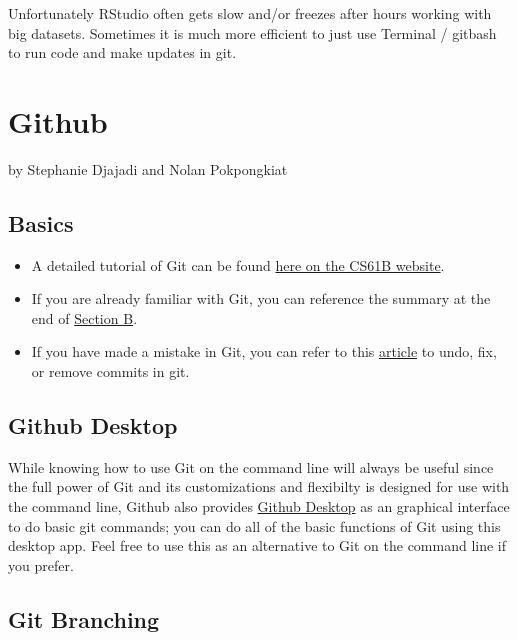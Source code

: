 \documentclass[]{book}
\providecommand{\tightlist}{%
  \setlength{\itemsep}{0pt}\setlength{\parskip}{0pt}}
\begin{document}
Unfortunately RStudio often gets slow and/or freezes after hours working
with big datasets. Sometimes it is much more efficient to just use
Terminal / gitbash to run code and make updates in git.

\chapter{Github}\label{github}

by Stephanie Djajadi and Nolan Pokpongkiat

\section{Basics}\label{basics}

\begin{itemize}
\tightlist
\item
  A detailed tutorial of Git can be found
  \href{https://sp19.datastructur.es/materials/guides/using-git\#b-local-repositories-narrative-introduction}{here
  on the CS61B website}.
\item
  If you are already familiar with Git, you can reference the summary at
  the end of
  \href{https://sp19.datastructur.es/materials/guides/using-git\#b-local-repositories-narrative-introduction}{Section
  B}.
\item
  If you have made a mistake in Git, you can refer to this
  \href{https://sethrobertson.github.io/GitFixUm/fixup.html}{article} to
  undo, fix, or remove commits in git.
\end{itemize}

\section{Github Desktop}\label{github-desktop}

While knowing how to use Git on the command line will always be useful
since the full power of Git and its customizations and flexibilty is
designed for use with the command line, Github also provides
\href{https://desktop.github.com/}{Github Desktop} as an graphical
interface to do basic git commands; you can do all of the basic
functions of Git using this desktop app. Feel free to use this as an
alternative to Git on the command line if you prefer.

\section{Git Branching}\label{git-branching}
\end{document}
